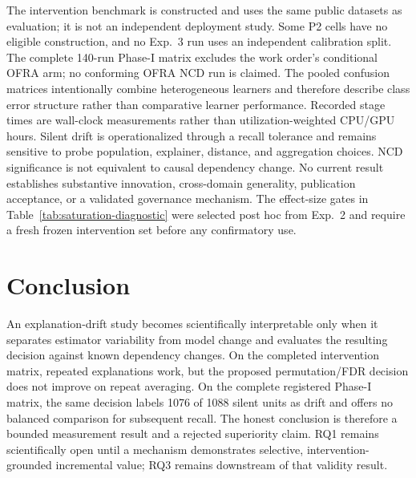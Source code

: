 \documentclass[10pt]{article}
\begin{document}
The intervention benchmark is constructed and uses the same public datasets
as evaluation; it is not an independent deployment study.  Some P2 cells have
no eligible construction, and no Exp.~3 run uses an independent calibration
split.  The complete 140-run Phase-I matrix excludes the work order's
conditional OFRA arm; no conforming OFRA NCD run is claimed.  The pooled
confusion matrices intentionally combine heterogeneous learners and therefore
describe class error structure rather than comparative learner performance.
Recorded stage times are wall-clock measurements rather than
utilization-weighted CPU/GPU hours.  Silent drift is operationalized through a
recall tolerance and remains sensitive to probe population, explainer,
distance, and aggregation choices.  NCD significance is not equivalent to
causal dependency change.  No current result establishes substantive
innovation, cross-domain generality, publication acceptance, or a validated
governance mechanism.  The effect-size gates in
Table~\ref{tab:saturation-diagnostic} were selected post hoc from Exp.~2 and
require a fresh frozen intervention set before any confirmatory use.

\section{Conclusion}

An explanation-drift study becomes scientifically interpretable only when it
separates estimator variability from model change and evaluates the resulting
decision against known dependency changes.  On the completed intervention
matrix, repeated explanations work, but the proposed permutation/FDR decision
does not improve on repeat averaging.  On the complete registered Phase-I
matrix, the same decision labels 1076 of 1088 silent units as drift and offers
no balanced comparison for subsequent recall.  The honest conclusion is
therefore a bounded measurement result and a rejected superiority claim.  RQ1
remains scientifically open until a mechanism demonstrates selective,
intervention-grounded incremental value; RQ3 remains downstream of that
validity result.
\end{document}
